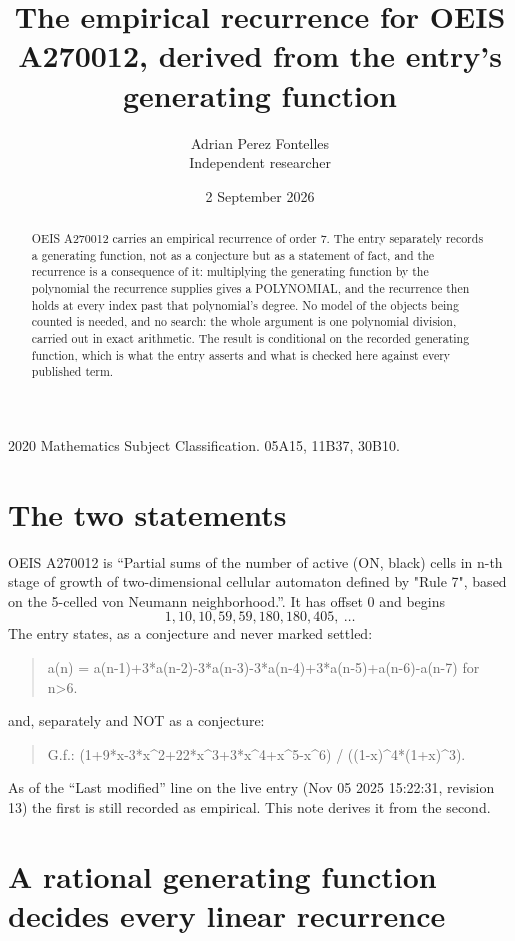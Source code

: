 \documentclass[11pt,a4paper]{article}
\title{The empirical recurrence for OEIS A270012, derived from the entry's generating function}
\author{Adrian Perez Fontelles\\ \small Independent researcher}
\date{2 September 2026}
\theoremstyle{plain}
\theoremstyle{definition}
\begin{document}
\maketitle

\begin{abstract}
OEIS A270012 carries an empirical recurrence of order $7$. The entry separately records a
generating function, not as a conjecture but as a statement of fact, and the recurrence is a
consequence of it: multiplying the generating function by the polynomial the recurrence
supplies gives a POLYNOMIAL, and the recurrence then holds at every index past that
polynomial's degree. No model of the objects being counted is needed, and no search: the
whole argument is one polynomial division, carried out in exact arithmetic. The result is
conditional on the recorded generating function, which is what the entry asserts and what is
checked here against every published term.
\end{abstract}

\noindent\small 2020 Mathematics Subject Classification. 05A15, 11B37, 30B10.\normalsize

\section{The two statements}

OEIS A270012 is ``Partial sums of the number of active (ON, black) cells in n-th stage of growth of two-dimensional cellular automaton defined by "Rule 7", based on the 5-celled von Neumann neighborhood.''. It has offset $0$ and begins
\[
1, 10, 10, 59, 59, 180, 180, 405,\ \dots
\]
The entry states, as a conjecture and never marked settled:
\begin{quote}
a(n) = a(n-1)+3*a(n-2)-3*a(n-3)-3*a(n-4)+3*a(n-5)+a(n-6)-a(n-7) for n>6.
\end{quote}
and, separately and NOT as a conjecture:
\begin{quote}
G.f.: (1+9*x-3*x\^{}2+22*x\^{}3+3*x\^{}4+x\^{}5-x\^{}6) / ((1-x)\^{}4*(1+x)\^{}3).
\end{quote}
As of the ``Last modified'' line on the live entry (Nov 05 2025 15:22:31, revision 13) the first is still
recorded as empirical. This note derives it from the second.

\section{A rational generating function decides every linear recurrence}
\end{document}
